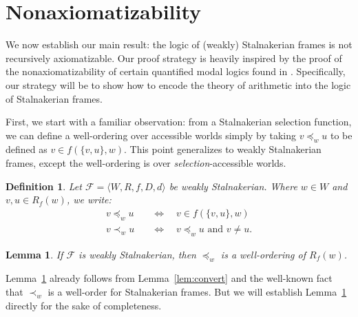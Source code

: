 \documentclass[12pt]{article}
\newtheorem{lemma}{Lemma}
\newtheorem{definition}{Definition}
\newcommand{\tup}[1]{\langle #1 \rangle}
\begin{document}
\section{Nonaxiomatizability}\label{sec:proof}

We now establish our main result: the logic of (weakly) Stalnakerian frames is not recursively axiomatizable. 
Our proof strategy is heavily inspired by the proof of the nonaxiomatizability of certain quantified modal logics found in \cite{Cresswell1997incompletable}. 
Specifically, our strategy will be to show how to encode the theory of arithmetic into the logic of Stalnakerian frames. 

First, we start with a familiar observation: from a Stalnakerian selection function, we can define a well-ordering over accessible worlds simply by taking $v \preceq_w u$ to be defined as $v \in f(\{v,u\},w)$. 
This point generalizes to weakly Stalnakerian frames, except the well-ordering is over \emph{selection}-accessible worlds. 

\begin{definition}
    Let $\mathcal{F} = \tup{W,R,f,D,d}$ be weakly Stalnakerian. 
    Where $w \in W$ and $v,u \in R_f(w)$, we write:
    \begin{align*}
        v \preceq_w u & \quad\Leftrightarrow\quad v \in f(\{v,u\},w) \\
        v \prec_w u & \quad\Leftrightarrow\quad v \preceq_w u \text{ and } v \neq u.
    \end{align*}
\end{definition}


\begin{lemma}\label{lem:world-order}
    If $\mathcal{F}$ is weakly Stalnakerian, then $\preceq_w$ is a well-ordering of $R_f(w)$. 
\end{lemma}

Lemma~\ref{lem:world-order} already follows from Lemma~\ref{lem:convert} and the well-known fact that $\prec_w$ is a well-order for Stalnakerian frames. 
But we will establish Lemma~\ref{lem:world-order} directly for the sake of completeness. 

\end{document}
